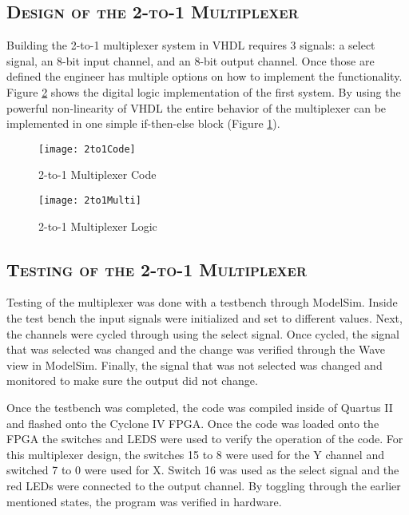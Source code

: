 \documentclass[11pt]{report}
\begin{document}
\begin{spacing}{1.5}
\subsection{\scshape Design of the 2-to-1 Multiplexer}
\label{sub:design_2to1}

Building the 2-to-1 multiplexer system in VHDL requires 3 signals: a select signal, an 8-bit input channel, and an 8-bit output channel.  Once those are defined the engineer has multiple options on how to implement the functionality. Figure \ref{fig:logic_2to1} shows the digital logic implementation of the first system.  By using the powerful non-linearity of VHDL the entire behavior of the multiplexer can be implemented in one simple if-then-else block (Figure \ref{fig:code_2to1}).

\vspace{30px}
\begin{figure}[H]
    \centering
    \texttt{[image: 2to1Code]}
    \caption{2-to-1 Multiplexer Code\cite{Synth}}
    \label{fig:code_2to1}
\end{figure}

\begin{figure}[H]
    \centering
    \texttt{[image: 2to1Multi]}
    \caption{2-to-1 Multiplexer Logic}
    \label{fig:logic_2to1}
\end{figure}

\subsection{\scshape Testing of the 2-to-1 Multiplexer}
\label{sec:test_2to1}

Testing of the multiplexer was done with a testbench through ModelSim.  Inside the test bench the input signals were initialized and set to different values.  Next, the channels were cycled through using the select signal.  Once cycled, the signal that was selected was changed and the change was verified through the Wave view in ModelSim.  Finally, the signal that was not selected was changed and monitored to make sure the output did not change.

Once the testbench was completed, the code was compiled inside of Quartus II and flashed onto the Cyclone IV FPGA.  Once the code was loaded onto the FPGA the switches and LEDS were used to verify the operation of the code.  For this multiplexer design, the switches 15 to 8 were used for the Y channel and switched 7 to 0 were used for X.  Switch 16 was used as the select signal and the red LEDs were connected to the output channel.  By toggling through the earlier mentioned states, the program was verified in hardware.


\end{spacing}
\end{document}
